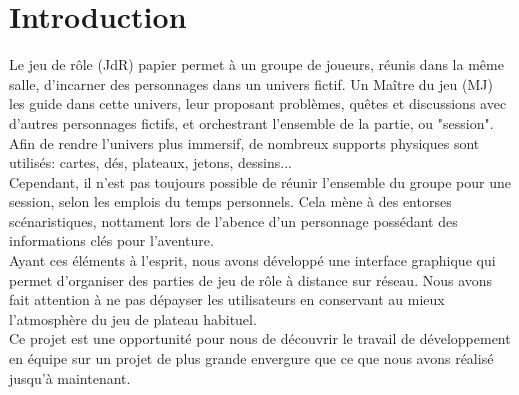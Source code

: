 \section{Introduction}

Le jeu de rôle (JdR) papier permet à un groupe de joueurs, réunis dans la même salle, d'incarner des personnages dans un univers fictif. Un Maître du jeu (MJ) les guide dans cette univers, leur proposant problèmes, quêtes et discussions avec d'autres personnages fictifs, et orchestrant l'ensemble de la partie, ou "session". Afin de rendre l'univers plus immersif, de nombreux supports physiques sont utilisés: cartes, dés, plateaux, jetons, dessins...\\
Cependant, il n'est pas toujours possible de réunir l'ensemble du groupe pour une session, selon les emplois du temps personnels. Cela mène à des entorses scénaristiques, nottament lors de l'abence d'un personnage possédant des informations clés pour l'aventure.\\

Ayant ces éléments à l'esprit, nous avons développé une interface graphique qui permet d'organiser des parties de jeu de rôle à distance sur réseau. Nous avons fait attention à ne pas dépayser les utilisateurs en conservant au mieux l'atmosphère du jeu de plateau habituel.\\

Ce projet est une opportunité pour nous de découvrir le travail de développement en équipe sur un projet de plus grande envergure que ce que nous avons réalisé jusqu'à maintenant.	
